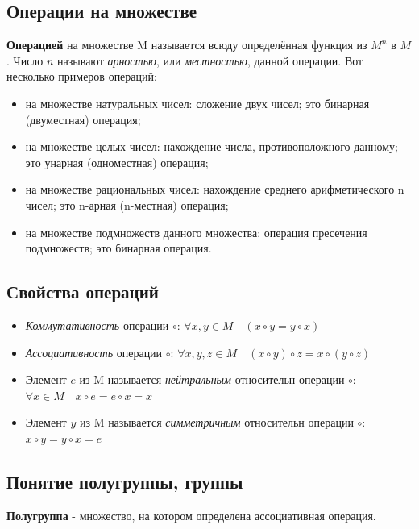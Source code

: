 \documentclass[a4paper]{article}
\begin{document}
\newpage \begin{center}\begin{Large}\end{Large}\end{center}
\subsection*{Операции на множестве}
\textbf{Операцией} на множестве M называется всюду
определённая функция из $M^n$ в $M$. Число $n$ называют \textit{арностью}, или
\textit{местностью}, данной операции.
Вот несколько примеров операций:
\begin{itemize}
\item на множестве натуральных чисел: сложение двух чисел; это бинарная
(двуместная) операция;
\item на множестве целых чисел: нахождение числа, противоположного
данному; это унарная (одноместная) операция;
\item на множестве рациональных чисел: нахождение среднего арифметического
n чисел; это n-арная (n-местная) операция;
\item на множестве подмножеств данного множества: операция пресечения
подмножеств; это бинарная операция.
\end{itemize}

\subsection*{Свойства операций}
\begin{itemize}
\item \textit{Коммутативность} операции $\circ$: $\forall x, y \in M \quad (x \circ y = y \circ x)$
\item \textit{Ассоциативность} операции $\circ$: $\forall x, y, z \in M \quad (x \circ y) \circ z = x \circ (y \circ z)$
\item Элемент $e$ из M называется \textit{нейтральным} относительн операции $\circ$: $\forall x \in M \quad x \circ e = e \circ x = x$
\item Элемент $y$ из M называется \textit{симметричным} относительн операции $\circ$: $x \circ y = y \circ x = e$
\end{itemize}

\subsection*{Понятие полугруппы, группы}
\textbf{Полугруппа} - множество, на котором определена ассоциативная операция.
\end{document}

